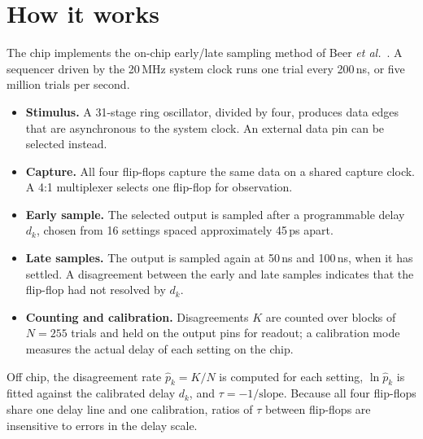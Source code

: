 \documentclass[10pt]{article}
\begin{document}
\section{How it works}
The chip implements the on-chip early/late sampling method of Beer \emph{et al.}~\cite{iscas}. A sequencer driven by the
20\,MHz system clock runs one trial every 200\,ns, or five million trials per second.
\begin{itemize}
\item \textbf{Stimulus.} A 31-stage ring oscillator, divided by four, produces data edges that are asynchronous to the
  system clock. An external data pin can be selected instead.
\item \textbf{Capture.} All four flip-flops capture the same data on a shared capture clock. A 4:1 multiplexer selects
  one flip-flop for observation.
\item \textbf{Early sample.} The selected output is sampled after a programmable delay $d_k$, chosen from 16 settings
  spaced approximately 45\,ps apart.
\item \textbf{Late samples.} The output is sampled again at 50\,ns and 100\,ns, when it has settled. A disagreement
  between the early and late samples indicates that the flip-flop had not resolved by $d_k$.
\item \textbf{Counting and calibration.} Disagreements $K$ are counted over blocks of $N = 255$ trials and held on the
  output pins for readout; a calibration mode measures the actual delay of each setting on the chip.
\end{itemize}
Off chip, the disagreement rate $\hat{p}_k = K/N$ is computed for each setting, $\ln \hat{p}_k$ is fitted against the
calibrated delay $d_k$, and $\tau = -1/\text{slope}$. Because all four flip-flops share one delay line and one
calibration, ratios of $\tau$ between flip-flops are insensitive to errors in the delay scale.
\end{document}
